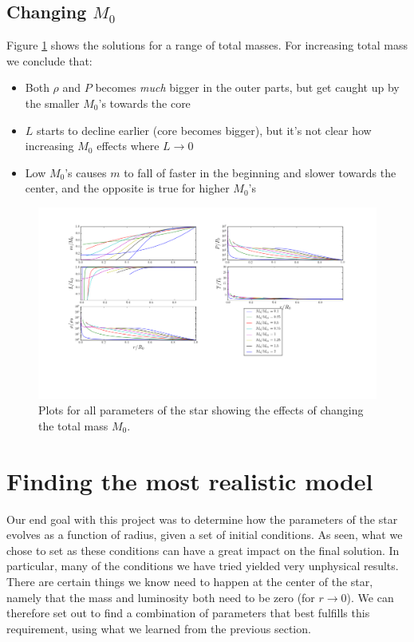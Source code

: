 \documentclass[11pt,twocolumn]{article}
\begin{document}
\subsection{Changing $M_0$}
Figure \ref{fig:M-variation} shows the solutions for a range of total
masses. For increasing total mass we conclude that:

\begin{itemize}
  \item Both $\rho$ and $P$ becomes \emph{much} bigger in the outer
    parts, but get caught up by the smaller $M_0$'s towards the core
  \item $L$ starts to decline earlier (core becomes bigger), but it's
    not clear how increasing $M_0$ effects where $L\rightarrow 0$
  \item Low $M_0$'s causes $m$ to fall of faster in the beginning and
    slower towards the center, and the opposite is true for higher $M_0$'s
\end{itemize}

\begin{figure}[ht]
  \centering
  \includegraphics[width=\linewidth]{fig/M_variation.png}
  \caption{\label{fig:M-variation} Plots for all parameters of the star
  showing the effects of changing the total mass $M_0$.}
\end{figure}


\section{Finding the most realistic model}
Our end goal with this project was to determine how the parameters of
the star evolves as a function of radius, given a set of initial
conditions. As seen, what we chose to set as these conditions can have
a great impact on the final solution. In particular, many of the
conditions we have tried yielded very unphysical results. There are
certain things we know need to happen at the center of the star,
namely that the mass and luminosity both need to be zero (for
$r\rightarrow 0$). We can therefore set out to find a combination of
parameters that best fulfills this requirement, using what we learned
from the previous section. 
\end{document}
